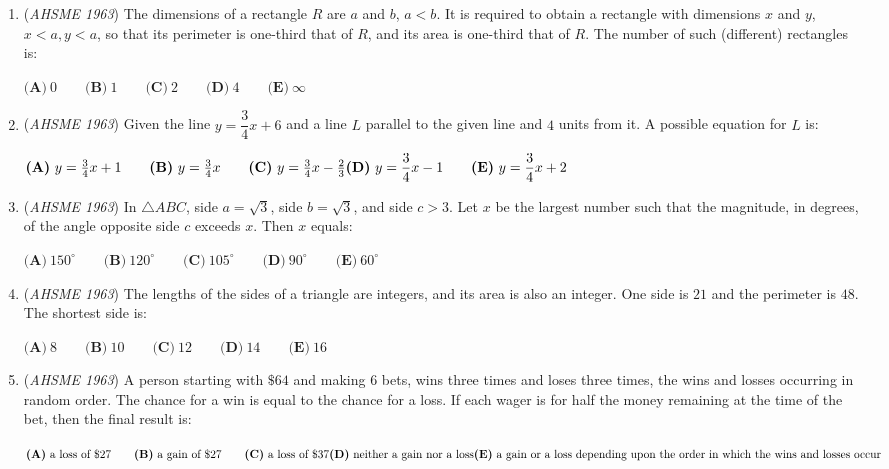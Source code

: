 \begin{enumerate}
	\item (\textit{AHSME 1963}) The dimensions of a rectangle $R$ are $a$ and $b$, $a < b$. It is required to obtain a rectangle with dimensions $x$ and $y$, $x < a, y < a$, 
so that its perimeter is one-third that of $R$, and its area is one-third that of $R$. The number of such (different) rectangles is:


 $\textbf{(A)}\ 0 \qquad \textbf{(B)}\ 1\qquad \textbf{(C)}\ 2 \qquad \textbf{(D)}\ 4 \qquad \textbf{(E)}\ \infty$


	\item (\textit{AHSME 1963}) Given the line $y = \dfrac{3}{4}x + 6$ and a line $L$ parallel to the given line and $4$ units from it. A possible equation for $L$ is:


 $\textbf{(A)}\ y =\frac{3}{4}x+1\qquad \textbf{(B)}\ y =\frac{3}{4}x\qquad \textbf{(C)}\ y =\frac{3}{4}x-\frac{2}{3}\qquad  \\ \textbf{(D)}\ y = \dfrac{3}{4}x -1 \qquad \textbf{(E)}\ y = \dfrac{3}{4}x + 2$


	\item (\textit{AHSME 1963}) In $\triangle ABC$, side $a = \sqrt{3}$, side $b = \sqrt{3}$, and side $c > 3$. Let $x$ be the largest number such that the magnitude, 
in degrees, of the angle opposite side $c$ exceeds $x$. Then $x$ equals:


 $\textbf{(A)}\ 150^{\circ} \qquad \textbf{(B)}\ 120^{\circ}\qquad \textbf{(C)}\ 105^{\circ} \qquad \textbf{(D)}\ 90^{\circ} \qquad \textbf{(E)}\ 60^{\circ}$


	\item (\textit{AHSME 1963}) The lengths of the sides of a triangle are integers, and its area is also an integer. 
One side is $21$ and the perimeter is $48$. The shortest side is:


 $\textbf{(A)}\ 8 \qquad \textbf{(B)}\ 10\qquad \textbf{(C)}\ 12 \qquad \textbf{(D)}\ 14 \qquad \textbf{(E)}\ 16$


	\item (\textit{AHSME 1963}) A person starting with $\$64$ and making $6$ bets, wins three times and loses three times, 
the wins and losses occurring in random order. The chance for a win is equal to the chance for a loss. 
If each wager is for half the money remaining at the time of the bet, then the final result is:


 $\textbf{(A)}\text{ a loss of }\$ 27 \qquad \textbf{(B)}\text{ a gain of }\$ 27 \qquad \textbf{(C)}\text{ a loss of }\$ 37 \qquad \\ \textbf{(D)}\text{ neither a gain nor a loss}\qquad \\ \textbf{(E)}\text{ a gain or a loss depending upon the order in which the wins and losses occur}$



\end{enumerate}
